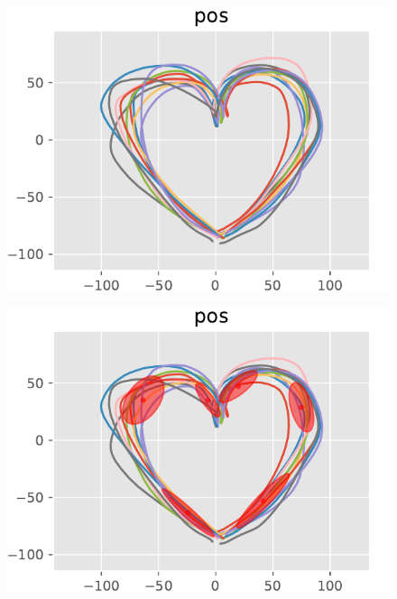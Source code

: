 \documentclass[twocolumn]{preport}
\begin{document}
\begin{figure}[htbp]
  \begin{center}
    \begin{minipage}[t]{0.30\hsize}
      \begin{center}
        \includegraphics[clip, width=1.0\columnwidth]{figs/heart_orig_pos}
        \label{figure:input}
      \end{center}
    \end{minipage}
    \begin{minipage}[t]{0.30\hsize}
      \begin{center}
        \includegraphics[clip, width=1.0\columnwidth]{figs/heart_hmm_pos}
        \label{figure:HMM}

\end{center}
\end{minipage}
\end{center}
\end{figure}
\end{document}
